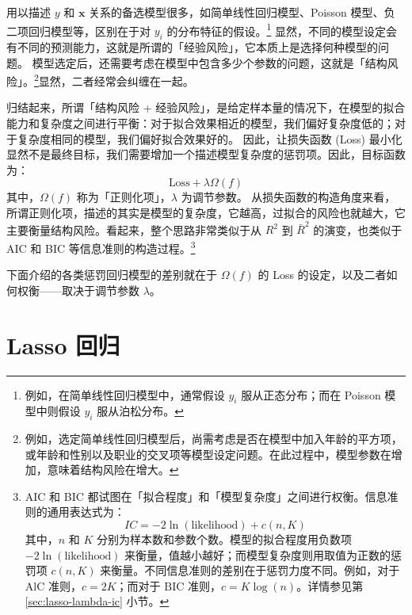 用以描述 $y$ 和 $\mathbf{x}$ 关系的备选模型很多，如简单线性回归模型、Poisson 模型、负二项回归模型等，区别在于对 $y_i$ 的分布特征的假设。\footnote{%
      例如，在简单线性回归模型中，通常假设 $y_i$ 服从正态分布；而在 Poisson 模型中则假设 $y_i$ 服从泊松分布。}
显然，不同的模型设定会有不同的预测能力，这就是所谓的「经验风险」，它本质上是选择何种模型的问题。
模型选定后，还需要考虑在模型中包含多少个参数的问题，这就是「结构风险」。\footnote{%
     例如，选定简单线性回归模型后，尚需考虑是否在模型中加入年龄的平方项，或年龄和性别以及职业的交叉项等模型设定问题。在此过程中，模型参数在增加，意味着结构风险在增大。 }显然，二者经常会纠缠在一起。

归结起来，所谓「结构风险 + 经验风险」，是给定样本量的情况下，在模型的拟合能力和复杂度之间进行平衡：对于拟合效果相近的模型，我们偏好复杂度低的；对于复杂度相同的模型，我们偏好拟合效果好的。
因此，让损失函数 (Loss) 最小化显然不是最终目标，我们需要增加一个描述模型复杂度的惩罚项。因此，目标函数为：
\begin{equation}\label{eq:Lasso-08}
	\text{Loss}+\lambda \Omega(f)
\end{equation}
其中，$\Omega(f)$ 称为「正则化项」，$\lambda$ 为调节参数。
从损失函数的构造角度来看，所谓正则化项，描述的其实是模型的复杂度，它越高，过拟合的风险也就越大，它主要衡量结构风险。看起来，整个思路非常类似于从 $R^2$ 到 $\bar{R}^2$ 的演变，也类似于 AIC 和 BIC 等信息准则的构造过程。\footnote{%
      AIC 和 BIC 都试图在「拟合程度」和「模型复杂度」之间进行权衡。信息准则的通用表达式为：
        $$
        IC = -2\ln(\mathrm{likelihood}) + c(n, K)
        $$
      其中，$n$ 和 $K$ 分别为样本数和参数个数。模型的拟合程度用负数项 $-2\ln(\mathrm{likelihood})$ 来衡量，值越小越好；而模型复杂度则用取值为正数的惩罚项 $c(n, K)$ 来衡量。不同信息准则的差别在于惩罚力度不同。例如，对于 $\mathrm{AlC}$ 准则，$c=2 K$；而对于 $\mathrm{BIC}$ 准则，$c=K \log (n)$。详情参见第 \ref{sec:lasso-lambda-ic} 小节。
      }

下面介绍的各类惩罚回归模型的差别就在于 $\Omega(f)$ 的 Loss 的设定，以及二者如何权衡——取决于调节参数 $\lambda$。


\section{Lasso 回归}


